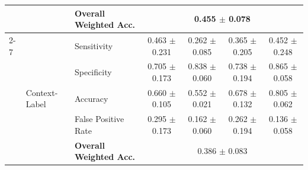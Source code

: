 \begin{table}[ht]
\begin{tabular}{l|llcccc}
  &   & \textbf{Overall Weighted Acc.}
                                & \multicolumn{4}{c}{0.455 $\pm$ 0.078} \\ \cmidrule{2-7}
  & \multirow{5}{*}{Context-Label}
      & Sensitivity            & 0.463 $\pm$ 0.231 & 0.262 $\pm$ 0.085 & 0.365 $\pm$ 0.205 & 0.452 $\pm$ 0.248 \\
  &   & Specificity            & 0.705 $\pm$ 0.173 & 0.838 $\pm$ 0.060 & 0.738 $\pm$ 0.194 & 0.865 $\pm$ 0.058 \\
  &   & Accuracy               & 0.660 $\pm$ 0.105 & 0.552 $\pm$ 0.021 & 0.678 $\pm$ 0.132 & 0.805 $\pm$ 0.062 \\
  &   & False Positive Rate    & 0.295 $\pm$ 0.173 & 0.162 $\pm$ 0.060 & 0.262 $\pm$ 0.194 & 0.136 $\pm$ 0.058 \\
  &   & \textbf{Overall Weighted Acc.}
                                & \multicolumn{4}{c}{0.386 $\pm$ 0.083} \\ \midrule


\end{tabular}
\end{table}
